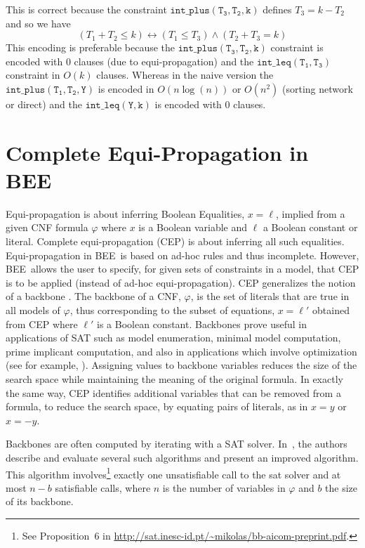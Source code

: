 \documentclass[runningheads,a4paper]{llncs}
\newcommand{\bee}{\textsf{BEE}}
\begin{document}
This is correct because the constraint
$\mathtt{int\_plus(T_3,T_2,k)}$ defines $T_3 = k-T_2$ and so we have
\[(T_1 + T_2 \leq k)    \leftrightarrow     
  (T_1 \leq T_3) \wedge  (T_2+T_3=k)
\]
This encoding is preferable  because the
$\mathtt{int\_plus(T_3,T_2,k)}$ constraint is encoded with 0 clauses
(due to equi-propagation) and the $\mathtt{int\_leq(T_1,T_3)}$
constraint in $O(k)$ clauses. Whereas in the naive version the
$\mathtt{int\_plus(T_1,T_2,Y)}$ is encoded in $O(n \log(n))$ or
$O(n^2)$ (sorting network or direct) and the $\mathtt{int\_leq(Y,k)}$
is encoded with 0 clauses.
 


\section{Complete Equi-Propagation in \bee}

Equi-propagation is about inferring Boolean Equalities, $x=\ell$,
implied from a given CNF formula $\varphi$ where $x$ is a Boolean
variable and $\ell$ a Boolean constant or literal. 
Complete equi-propagation (CEP) is about inferring all such
equalities.  Equi-propagation in \bee\ is based on ad-hoc rules and
thus incomplete. However, \bee\ allows the user to specify, for given
sets of constraints in a model, that CEP is to be applied (instead of
ad-hoc equi-propagation).
CEP generalizes the notion of a backbone \cite{Schneider96}. The
backbone of a CNF, $\varphi$, is the set of literals that are true in
all models of $\varphi$, thus corresponding to the subset of
equations, $x=\ell'$ obtained from CEP where $\ell'$ is a Boolean
constant. Backbones prove useful in applications of SAT such as model
enumeration, minimal model computation, prime implicant computation,
and also in applications which involve optimization (see for example,
\cite{Marques-SilvaJL10}).  Assigning values to backbone variables
reduces the size of the search space while maintaining the meaning of
the original formula. In exactly the same way, CEP identifies
additional variables that can be removed from a formula, to reduce the
search space, by equating pairs of literals, as in $x=y$ or $x=-y$.


Backbones are often computed by iterating with a SAT solver.
In~\cite{Marques-SilvaJL10}, the authors describe and evaluate several
such algorithms and present an improved algorithm. This algorithm
involves\footnote{See Proposition~6 in
  \url{http://sat.inesc-id.pt/~mikolas/bb-aicom-preprint.pdf}.}
exactly one unsatisfiable call to the sat solver and at most $n-b$
satisfiable calls, where $n$ is the number of variables in $\varphi$
and $b$ the size of its backbone.
\end{document}
